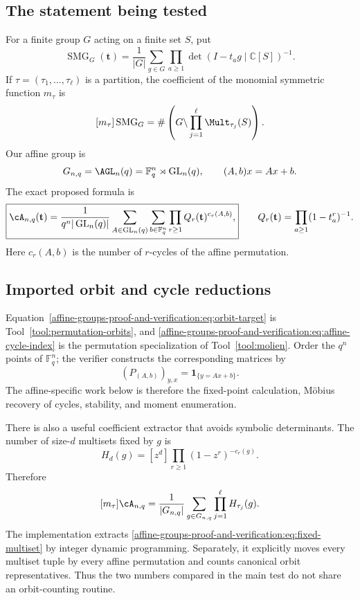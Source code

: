 \documentclass[10pt]{article}
\newcommand{\SMG}{\operatorname{SMG}}
\newcommand{\MGF}{\SMG}
\newcommand{\F}{\mathbb F}
\newcommand{\GL}{\operatorname{GL}}
\begin{document}
\subsection{The statement being tested}
For a finite group $G$ acting on a finite set $S$, put
\[
 \MGF_G(\mathbf t)=\frac1{|G|}\sum_{g\in G}
 \prod_{a\ge1}\det(I-t_ag\mid\mathbb C[S])^{-1}.
\]
If $\tau=(\tau_1,\ldots,\tau_\ell)$ is a partition, the coefficient of the
monomial symmetric function $m_\tau$ is
\begin{equation}\label{affine-groups-proof-and-verification:eq:orbit-target}
 [m_\tau]\MGF_G
 =\#\left(G\backslash\prod_{j=1}^{\ell}\Mult_{\tau_j}(S)\right).
\end{equation}
Our affine group is
\[
 G_{n,q}=\AGL_n(q)=\F_q^n\rtimes\GL_n(q),\qquad
 (A,b)x=Ax+b.
\]
The exact proposed formula is
\begin{equation}\label{affine-groups-proof-and-verification:eq:affine-cycle-index}
 \boxed{\cA_{n,q}(\mathbf t)=\frac1{q^n|\GL_n(q)|}
 \sum_{A\in\GL_n(q)}\sum_{b\in\F_q^n}
 \prod_{r\ge1}Q_r(\mathbf t)^{c_r(A,b)},}
 \qquad
 Q_r(\mathbf t)=\prod_{a\ge1}(1-t_a^r)^{-1}.
\end{equation}
Here $c_r(A,b)$ is the number of $r$-cycles of the affine permutation.

\subsection{Imported orbit and cycle reductions}
Equation~\eqref{affine-groups-proof-and-verification:eq:orbit-target} is
Tool~\ref{tool:permutation-orbits}, and
\eqref{affine-groups-proof-and-verification:eq:affine-cycle-index} is the
permutation specialization of Tool~\ref{tool:molien}.  Order the $q^n$ points
of $\F_q^n$; the verifier constructs the corresponding matrices by
\[
 (P_{(A,b)})_{y,x}=\mathbf 1_{\{y=Ax+b\}}.
\]
The affine-specific work below is therefore the fixed-point calculation,
M\"obius recovery of cycles, stability, and moment enumeration.

There is also a useful coefficient extractor that avoids symbolic
determinants.  The number of size-$d$ multisets fixed by $g$ is
\begin{equation}\label{affine-groups-proof-and-verification:eq:fixed-multiset}
 H_d(g)=[z^d]\prod_{r\ge1}(1-z^r)^{-c_r(g)}.
\end{equation}
Therefore
\begin{equation}\label{affine-groups-proof-and-verification:eq:burnside-coefficient}
 [m_\tau]\cA_{n,q}=\frac1{|G_{n,q}|}\sum_{g\in G_{n,q}}
 \prod_{j=1}^{\ell}H_{\tau_j}(g).
\end{equation}
The implementation extracts \eqref{affine-groups-proof-and-verification:eq:fixed-multiset} by integer dynamic
programming.  Separately, it explicitly moves every multiset tuple by every
affine permutation and counts canonical orbit representatives.  Thus the two
numbers compared in the main test do not share an orbit-counting routine.
\end{document}
